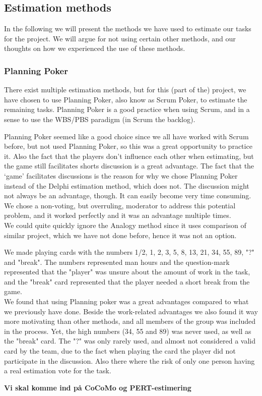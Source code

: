 \subsection{Estimation methods}
In the following we will present the methods we have used to estimate our tasks for the project. We will argue for not using certain other methods, and our thoughts on how we experienced the use of these methods.
\subsubsection{Planning Poker}
There exist multiple estimation methods, but for this (part of the) project, we have chosen to use Planning Poker, also know as Scrum Poker, to estimate the remaining tasks. Planning Poker is a good practice when using Scrum, and in a sense to use the WBS/PBS paradigm (in Scrum the backlog).

Planning Poker seemed like a good choice since we all have worked with Scrum before, but not used Planning Poker, so this was a great opportunity to practice it. Also the fact that the players don't influence each other when estimating, but the game still facilitates shorts discussion is a great advantage. The fact that the `game' facilitates discussions is the reason for why we chose Planning Poker instead of the Delphi estimation method, which does not. The discussion might not always be an advantage, though. It can easily become very time consuming. We chose a non-voting, but overruling, moderator to address this potential problem, and it worked perfectly and it was an advantage multiple times.\\
We could quite quickly ignore the Analogy method since it uses comparison of similar project, which we have not done before, hence it was not an option.

We made playing cards with the numbers 1/2, 1, 2, 3, 5, 8, 13, 21, 34, 55, 89, "?" and "break". The numbers represented man hours and the question-mark represented that the "player" was unsure about the amount of work in the task, and the "break" card represented that the player needed a short break from the game.\\
We found that using Planning poker was a great advantages compared to what we previously have done. Beside the work-related advantages we also found it way more motivating than other methods, and all members of the group was included in the process. Yet, the high numbers (34, 55 and 89) was never used, as well as the "break" card. The "?" was only rarely used, and almost not considered a valid card by the team, due to the fact when playing the card the player did not participate in the discussion. Also there where the risk of only one person having a real estimation vote for the task.

\textbf{Vi skal komme ind på CoCoMo og PERT-estimering}